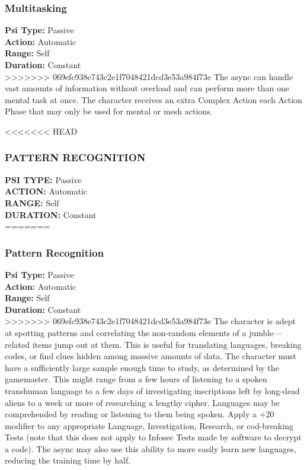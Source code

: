 \subsubsection{Multitasking}
\textbf{Psi Type:} Passive \\ 
\textbf{Action:} Automatic \\ 
\textbf{Range:} Self \\ 
\textbf{Duration:} Constant \\
>>>>>>> 069efc938e743c2e1f7048421dcd3e53a984f73e
The async can handle vast amounts of information
without overload and can perform more than one
mental task at once. The character receives an extra
Complex Action each Action Phase that may only be
used for mental or mesh actions.

<<<<<<< HEAD
\subsubsection{PATTERN RECOGNITION}
\textbf{PSI TYPE:} Passive \\ 
\textbf{ACTION:} Automatic \\ 
\textbf{RANGE:} Self \\ 
\textbf{DURATION:} Constant \\
=======
\subsubsection{Pattern Recognition}
\textbf{Psi Type:} Passive \\ 
\textbf{Action:} Automatic \\ 
\textbf{Range:} Self \\ 
\textbf{Duration:} Constant \\
>>>>>>> 069efc938e743c2e1f7048421dcd3e53a984f73e
The character is adept at spotting patterns and correlating
the non-random elements of a jumble—related
items jump out at them. This is useful for translating
languages, breaking codes, or find clues hidden among
massive amounts of data. The character must have
a sufficiently large sample enough time to study, as
determined by the gamemaster. This might range from
a few hours of listening to a spoken transhuman language
to a few days of investigating inscriptions left
by long-dead aliens to a week or more of researching
a lengthy cipher. Languages may be comprehended by
reading or listening to them being spoken. Apply a
+20 modifier to any appropriate Language, Investigation,
Research, or cod-breaking Tests (note that this
does not apply to Infosec Tests made by software to
decrypt a code). The async may also use this ability to
more easily learn new languages, reducing the training
time by half.

